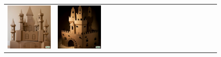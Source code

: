 \begin{figure}[ht!]
\begin{adjustwidth}{-0.8in}{-0.5in}
\begin{tabular}{cccccccccccccccccccc}
\multicolumn{2}{c}{\includegraphics[width=\threebythreecolwidth\textwidth]{figures/cherries/cardboard_castle_0.jpg}} &
\multicolumn{2}{c}{\includegraphics[width=\threebythreecolwidth\textwidth]{figures/cherries/cardboard_castle_1.jpg}} &

\end{tabular}
\end{adjustwidth}
\end{figure}
